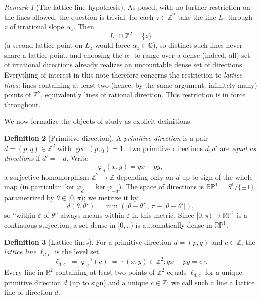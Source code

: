 \documentclass[a4paper,11pt,oneside,reqno]{amsart}
\theoremstyle{definition}
\newtheorem{definition}{Definition}
\theoremstyle{remark}
\newtheorem{remark}[definition]{Remark}
\theoremstyle{plain}
\newcommand{\Z}{\mathbb{Z}}
\newcommand{\R}{\mathbb{R}}
\newcommand{\RP}{\mathbb{RP}^1}
\begin{document}
\begin{remark}[The lattice-line hypothesis]
  \label{rem:hypothesis}
  As posed, with no further restriction on the lines allowed, the question is trivial: for each
  \(z\in\Z^2\) take the line \(L_z\) through \(z\) of irrational slope \(\alpha_z\). Then
  \begin{equation}
    \label{eq:irrational-line}
    L_z\cap\Z^2=\{z\}
  \end{equation}
  (a second lattice point on \(L_z\) would force \(\alpha_z\in\mathbb Q\)), so distinct such lines
  never share a lattice point, and choosing the \(\alpha_z\) to range over a dense (indeed, all) set of
  irrational directions already realizes an uncountable dense set of directions. Everything of
  interest in this note therefore concerns the restriction to \emph{lattice lines}: lines
  containing at least two (hence, by the same argument, infinitely many) points of \(\Z^2\),
  equivalently lines of rational direction. This restriction is in force throughout.
\end{remark}

We now formalize the objects of study as explicit definitions.

\begin{definition}[Primitive direction]
  \label{def:direction}
  A \emph{primitive direction} is a pair \(d=(p,q)\in\Z^2\) with \(\gcd(p,q)=1\). Two primitive
  directions \(d,d'\) are \emph{equal as directions} if \(d'=\pm d\). Write
  \begin{equation}
    \label{eq:phi-def}
    \varphi_d(x,y) = qx-py,
  \end{equation}
  a surjective homomorphism \(\Z^2\to\Z\) depending only on \(d\) up to sign of the whole map (in
  particular \(\ker\varphi_d=\ker\varphi_{-d}\)). The space of directions is \(\RP=S^1/\{\pm1\}\),
  parametrized by \(\theta\in[0,\pi)\); we metrize it by
  \begin{equation}
    \label{eq:RP-metric}
    d(\theta,\theta') = \min(|\theta-\theta'|,\,\pi-|\theta-\theta'|),
  \end{equation}
  so ``within \(\varepsilon\) of \(\theta\)'' always means within \(\varepsilon\) in this metric. Since
  \([0,\pi)\to\RP\) is a continuous surjection, a set dense in \([0,\pi)\) is automatically dense in
  \(\RP\).
\end{definition}

\begin{definition}[Lattice lines]
  \label{def:lline}
  For a primitive direction \(d=(p,q)\) and \(c\in\Z\), the \emph{lattice line} \(\ell_{d,c}\) is the
  level set
  \begin{equation}
    \label{eq:lline-def}
    \ell_{d,c} \;=\; \varphi_d^{-1}(c) \;=\; \{(x,y)\in\Z^2 : qx-py=c\}.
  \end{equation}
  Every line in \(\R^2\) containing at least two points of \(\Z^2\) equals \(\ell_{d,c}\) for a unique
  primitive direction \(d\) (up to sign) and a unique \(c\in\Z\); we call such a line a lattice line of
  direction \(d\).
\end{definition}
\end{document}
